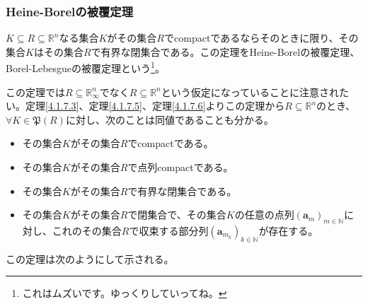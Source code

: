 \documentclass[dvipdfmx]{jsarticle}
\begin{document}
\subsubsection{Heine-Borelの被覆定理}%
\begin{thm}\label{4.1.7.7}
$K \subseteq R \subseteq \mathbb{R}^{n}$なる集合$K$がその集合$R$でcompactであるならそのときに限り、その集合$K$はその集合$R$で有界な閉集合である。この定理をHeine-Borelの被覆定理、Borel-Lebesgueの被覆定理という\footnote{これはムズいです。ゆっくりしていってね。}。
\end{thm}\par
この定理では$R \subseteq \mathbb{R}_{\infty}^{n}$でなく$R \subseteq \mathbb{R}^{n}$という仮定になっていることに注意されたい。定理\ref{4.1.7.3}、定理\ref{4.1.7.5}、定理\ref{4.1.7.6}よりこの定理から$R \subseteq \mathbb{R}^{n}$のとき、$\forall K \in \mathfrak{P}(R)$に対し、次のことは同値であることも分かる。
\begin{itemize}
\item
  その集合$K$がその集合$R$でcompactである。
\item
  その集合$K$がその集合$R$で点列compactである。
\item
  その集合$K$がその集合$R$で有界な閉集合である。
\item
  その集合$K$がその集合$R$で閉集合で、その集合$K$の任意の点列$\left( \mathbf{a}_{m} \right)_{m \in \mathbb{N}}$に対し、これのその集合$R$で収束する部分列$\left( \mathbf{a}_{m_{k}} \right)_{k \in \mathbb{N}}$が存在する。
\end{itemize}
この定理は次のようにして示される。
\end{document}
